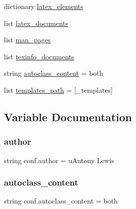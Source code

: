 \begin{DoxyCompactItemize}
\item 
dictionary \mbox{\hyperlink{namespaceconf_a82b98d5b4f4b8dee5476fb983fd85407}{latex\+\_\+elements}}
\item 
list \mbox{\hyperlink{namespaceconf_a00b7896473527f894006130b1113cb4b}{latex\+\_\+documents}}
\item 
list \mbox{\hyperlink{namespaceconf_a45cae4ca704c12a150b112eb1b66d0b1}{man\+\_\+pages}}
\item 
list \mbox{\hyperlink{namespaceconf_a22cc2d5df880ae78ca10c4675b494602}{texinfo\+\_\+documents}}
\item 
string \mbox{\hyperlink{namespaceconf_a4f32f3fe1dc51954586425e8561fd788}{autoclass\+\_\+content}} = \textquotesingle{}both\textquotesingle{}
\item 
list \mbox{\hyperlink{namespaceconf_ae850ae634911b713e036b43894fdd525}{templates\+\_\+path}} = \mbox{[}\textquotesingle{}\+\_\+templates\textquotesingle{}\mbox{]}
\end{DoxyCompactItemize}


\subsection{Variable Documentation}
\mbox{\label{namespaceconf_a6d7145a280c30059b454017b266c11c0}} 
\subsubsection{\texorpdfstring{author}{author}}
{\footnotesize\ttfamily string conf.\+author = u\textquotesingle{}Antony Lewis\textquotesingle{}}

\mbox{\label{namespaceconf_a4f32f3fe1dc51954586425e8561fd788}} 
\subsubsection{\texorpdfstring{autoclass\+\_\+content}{autoclass\_content}}
{\footnotesize\ttfamily string conf.\+autoclass\+\_\+content = \textquotesingle{}both\textquotesingle{}}

\mbox{\label{namespaceconf_a8e6ca51af260afe85dcd1f84fff99bdf}} 
